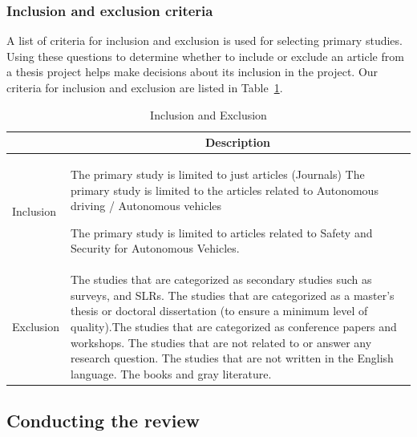 \documentclass[a4paper,12pt]{article}
\begin{document}
\newpage
\subsubsection{Inclusion and exclusion criteria}
\label{sec:Inclusion and exclusion criteria}

\hspace{5mm} A list of criteria for inclusion and exclusion is used for selecting primary studies. Using these questions to determine whether to include or exclude an article from a thesis project helps make decisions about its inclusion in the project. Our criteria for inclusion and exclusion are listed in Table~\ref{tab:inclusion_exclusion}.

\begin{table}[h]
\centering
\small
\setlength{\tabcolsep}{4pt}
\caption{Inclusion and Exclusion}
\label{tab:inclusion_exclusion}
\begin{tabularx}{\linewidth}{|>{\centering\arraybackslash}p{2cm}|X|}
\rowcolor[HTML]{00D2CB} 
\hline
\multicolumn{1}{|c|}{\textbf{Type}} & 
\multicolumn{1}{c|}{\textbf{Description}} \\
\hline
Inclusion & The primary study is limited to just articles (Journals) \newline The primary study is limited to the articles related to Autonomous driving / Autonomous vehicles

\newline The primary study is limited to articles related to Safety and Security for Autonomous Vehicles.\\\hline


Exclusion & The studies that are categorized as secondary studies such as surveys, and SLRs. \newline The studies that are categorized as a master’s thesis or doctoral dissertation (to ensure a minimum level of quality).\newline The studies that are categorized as conference papers and workshops. \newline The studies that are not related to or answer any research question. \newline The studies that are not written in the English language. \newline The books and gray literature.\\\hline
\end{tabularx}
\end{table}


\subsection{ Conducting the review}
\end{document}
